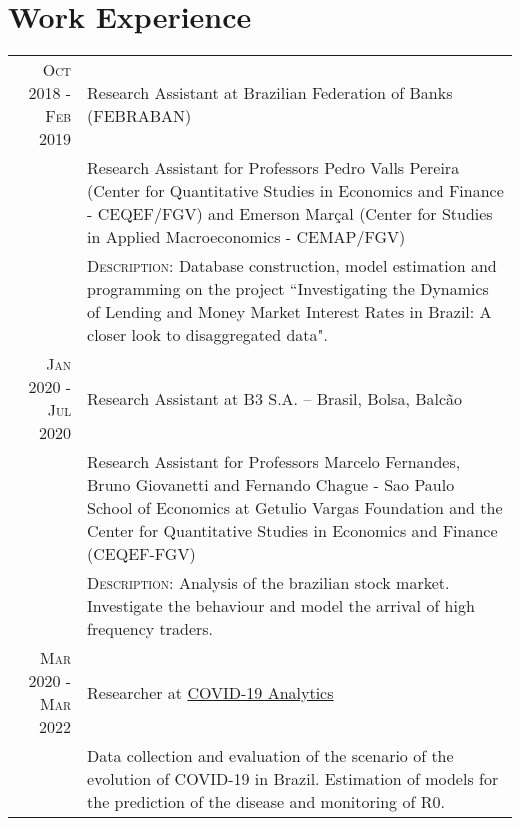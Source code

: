\documentclass[a4paper,10pt]{article}
\begin{document}
\section{Work Experience}
\begin{tabular}{r|p{10.75cm}}
    \textsc{Oct 2018 - Feb 2019} & Research Assistant at Brazilian Federation of Banks (FEBRABAN) \\
    &\footnotesize{Research Assistant for Professors Pedro Valls Pereira (Center for Quantitative Studies in Economics and Finance - CEQEF/FGV) and Emerson Marçal (Center for Studies in Applied Macroeconomics - CEMAP/FGV)}\\
    &\footnotesize{\textsc{Description}: Database construction, model estimation and programming on the project ``Investigating the Dynamics of Lending and Money Market Interest Rates in Brazil: A closer look to disaggregated data".} \\
    \textsc{Jan 2020 - Jul 2020} & Research Assistant at B3 S.A. – Brasil, Bolsa, Balcão \\
    &\footnotesize{Research Assistant for Professors Marcelo Fernandes, Bruno Giovanetti and Fernando Chague - Sao Paulo School of Economics at Getulio Vargas Foundation and the Center for Quantitative Studies in Economics and Finance (CEQEF-FGV)} \\
    &\footnotesize{\textsc{Description}: Analysis of the brazilian stock market. Investigate the behaviour and model the arrival of high frequency traders.} \\
    \textsc{Mar 2020 - Mar 2022} & Researcher at \href{https://covid19analytics.com.br/}{COVID-19 Analytics} \\
    &\footnotesize{Data collection and evaluation of the scenario of the evolution of COVID-19 in Brazil. Estimation of models for the prediction of the disease and monitoring of R0.} 
\end{tabular}

\end{document}
